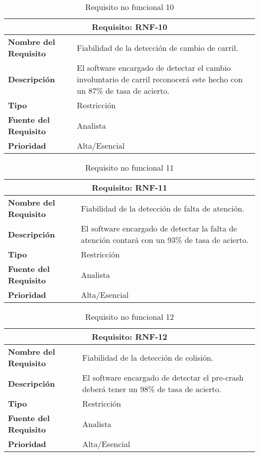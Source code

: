 \begin{table}[H]
\begin{center}
\begin{tabular}{p{} p{7cm}}
\multicolumn{2}{c}{\textbf{Requisito: RNF-10} } \\
\hline \hline
\textbf{Nombre del Requisito} & Fiabilidad de la detección de cambio de carril.\\
\hline
\textbf{Descripción} &  El software encargado de detectar el cambio involuntario de carril reconocerá este hecho con un 87\% de tasa de acierto.\\
\hline
\textbf{Tipo} & Restricción  \\
\hline
\textbf{Fuente del Requisito} & Analista  \\
\hline
\textbf{Prioridad} & Alta/Esencial \\ \hline
\end{tabular}
\caption{Requisito no funcional 10}
\label{tab:RNF-10}
\end{center}
\end{table}

\begin{table}[H]
\begin{center}
\begin{tabular}{p{} p{7cm}}
\multicolumn{2}{c}{\textbf{Requisito: RNF-11} } \\
\hline \hline
\textbf{Nombre del Requisito} & Fiabilidad de la detección de falta de atención.\\
\hline
\textbf{Descripción} &  El software encargado de detectar la falta de atención contará con un 93\% de tasa de acierto.\\
\hline
\textbf{Tipo} & Restricción  \\
\hline
\textbf{Fuente del Requisito} & Analista  \\
\hline
\textbf{Prioridad} & Alta/Esencial \\ \hline
\end{tabular}
\caption{Requisito no funcional 11}
\label{tab:RNF-11}
\end{center}
\end{table}

\begin{table}[H]
\begin{center}
\begin{tabular}{p{} p{7cm}}
\multicolumn{2}{c}{\textbf{Requisito: RNF-12} } \\
\hline \hline
\textbf{Nombre del Requisito} & Fiabilidad de la detección de colisión.\\
\hline
\textbf{Descripción} & El software encargado de detectar el pre-crash deberá tener un 98\% de tasa de acierto.\\
\hline
\textbf{Tipo} & Restricción  \\
\hline
\textbf{Fuente del Requisito} & Analista  \\
\hline
\textbf{Prioridad} & Alta/Esencial \\ \hline
\end{tabular}
\caption{Requisito no funcional 12}
\label{tab:RNF-12}
\end{center}
\end{table}


